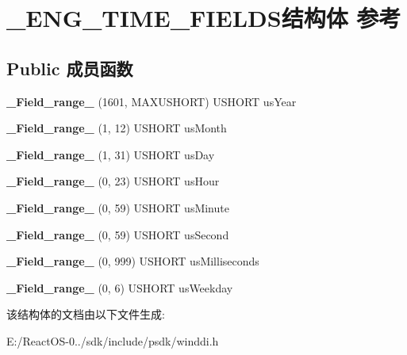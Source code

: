 \hypertarget{struct___e_n_g___t_i_m_e___f_i_e_l_d_s}{}\section{\+\_\+\+E\+N\+G\+\_\+\+T\+I\+M\+E\+\_\+\+F\+I\+E\+L\+D\+S结构体 参考}
\label{struct___e_n_g___t_i_m_e___f_i_e_l_d_s}
\subsection*{Public 成员函数}
\begin{DoxyCompactItemize}
\item 
\mbox{\label{struct___e_n_g___t_i_m_e___f_i_e_l_d_s_a7c8ae3137af977c74f518ce68e8424c2}} 
{\bfseries \+\_\+\+Field\+\_\+range\+\_\+} (1601, M\+A\+X\+U\+S\+H\+O\+RT) U\+S\+H\+O\+RT us\+Year
\item 
\mbox{\label{struct___e_n_g___t_i_m_e___f_i_e_l_d_s_a87983355901758d5bf711d7ec3cad3fe}} 
{\bfseries \+\_\+\+Field\+\_\+range\+\_\+} (1, 12) U\+S\+H\+O\+RT us\+Month
\item 
\mbox{\label{struct___e_n_g___t_i_m_e___f_i_e_l_d_s_abb3ee243eb42c186c155e7557f7172b2}} 
{\bfseries \+\_\+\+Field\+\_\+range\+\_\+} (1, 31) U\+S\+H\+O\+RT us\+Day
\item 
\mbox{\label{struct___e_n_g___t_i_m_e___f_i_e_l_d_s_a9d21b1750e2b8b8088a36862dcb36c42}} 
{\bfseries \+\_\+\+Field\+\_\+range\+\_\+} (0, 23) U\+S\+H\+O\+RT us\+Hour
\item 
\mbox{\label{struct___e_n_g___t_i_m_e___f_i_e_l_d_s_a7381feb5f85b4366aa93f2495f36bf4b}} 
{\bfseries \+\_\+\+Field\+\_\+range\+\_\+} (0, 59) U\+S\+H\+O\+RT us\+Minute
\item 
\mbox{\label{struct___e_n_g___t_i_m_e___f_i_e_l_d_s_a1c019b4b35a94131b8340e7cd586f11c}} 
{\bfseries \+\_\+\+Field\+\_\+range\+\_\+} (0, 59) U\+S\+H\+O\+RT us\+Second
\item 
\mbox{\label{struct___e_n_g___t_i_m_e___f_i_e_l_d_s_a6d7a2a61e7e2bafcfa54896f94956b02}} 
{\bfseries \+\_\+\+Field\+\_\+range\+\_\+} (0, 999) U\+S\+H\+O\+RT us\+Milliseconds
\item 
\mbox{\label{struct___e_n_g___t_i_m_e___f_i_e_l_d_s_ac5f70dfb32fb987089a4b0a7f5ea491a}} 
{\bfseries \+\_\+\+Field\+\_\+range\+\_\+} (0, 6) U\+S\+H\+O\+RT us\+Weekday
\end{DoxyCompactItemize}


该结构体的文档由以下文件生成\+:\begin{DoxyCompactItemize}
\item 
E\+:/\+React\+O\+S-\/0../sdk/include/psdk/winddi.\+h\end{DoxyCompactItemize}
